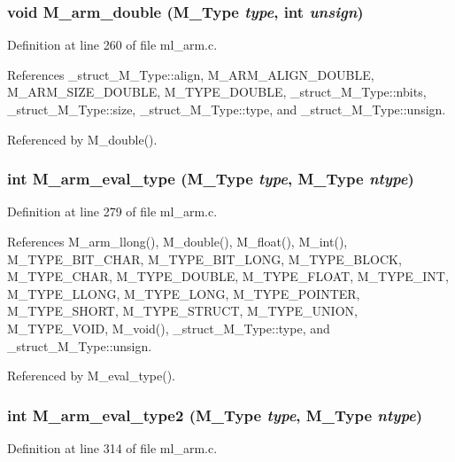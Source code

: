 \subsubsection{\setlength{\rightskip}{0pt plus 5cm}void M\_\-arm\_\-double (\bf{M\_\-Type} {\em type}, int {\em unsign})}\label{ml__arm_8c_a2d09b63a067761cd3179cdc3cb0dadf}




Definition at line 260 of file ml\_\-arm.c.

References \_\-struct\_\-M\_\-Type::align, M\_\-ARM\_\-ALIGN\_\-DOUBLE, M\_\-ARM\_\-SIZE\_\-DOUBLE, M\_\-TYPE\_\-DOUBLE, \_\-struct\_\-M\_\-Type::nbits, \_\-struct\_\-M\_\-Type::size, \_\-struct\_\-M\_\-Type::type, and \_\-struct\_\-M\_\-Type::unsign.

Referenced by M\_\-double().
\subsubsection{\setlength{\rightskip}{0pt plus 5cm}int M\_\-arm\_\-eval\_\-type (\bf{M\_\-Type} {\em type}, \bf{M\_\-Type} {\em ntype})}\label{ml__arm_8c_89cf94615c88cfe735177b54c0e35983}




Definition at line 279 of file ml\_\-arm.c.

References M\_\-arm\_\-llong(), M\_\-double(), M\_\-float(), M\_\-int(), M\_\-TYPE\_\-BIT\_\-CHAR, M\_\-TYPE\_\-BIT\_\-LONG, M\_\-TYPE\_\-BLOCK, M\_\-TYPE\_\-CHAR, M\_\-TYPE\_\-DOUBLE, M\_\-TYPE\_\-FLOAT, M\_\-TYPE\_\-INT, M\_\-TYPE\_\-LLONG, M\_\-TYPE\_\-LONG, M\_\-TYPE\_\-POINTER, M\_\-TYPE\_\-SHORT, M\_\-TYPE\_\-STRUCT, M\_\-TYPE\_\-UNION, M\_\-TYPE\_\-VOID, M\_\-void(), \_\-struct\_\-M\_\-Type::type, and \_\-struct\_\-M\_\-Type::unsign.

Referenced by M\_\-eval\_\-type().
\subsubsection{\setlength{\rightskip}{0pt plus 5cm}int M\_\-arm\_\-eval\_\-type2 (\bf{M\_\-Type} {\em type}, \bf{M\_\-Type} {\em ntype})}\label{ml__arm_8c_8b5e168794dd25817f2606b4816ef3f7}




Definition at line 314 of file ml\_\-arm.c.

